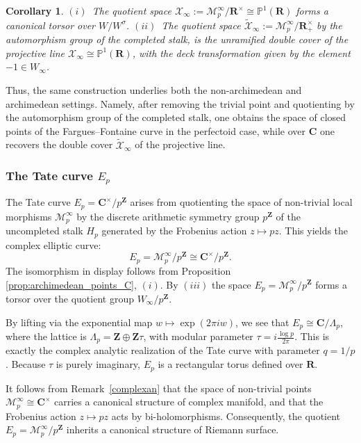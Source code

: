 \documentclass[11pt,a4paper]{article}
\newtheorem{corollary}[theorem]{Corollary}
\newcommand{\C}{\mathbf{C}}
\newcommand{\R}{\mathbf{R}}
\newcommand{\Z}{\mathbf{Z}}
\begin{document}
\begin{corollary}\label{luriearch}
$(i)$~The quotient space $\mathcal{X}_\infty :=\mathcal{M}_{p}^{\infty} / \R^\times\cong \mathbb{P}^1(\R)$  forms a canonical torsor over $W / W^\sigma$.\newline
$(ii)$~The quotient space $\widetilde{\mathcal{X}}_\infty:=\mathcal{M}_{p}^{\infty} / \R_+^\times$ by the automorphism group of the completed stalk, is the  unramified double cover of the projective line   $\mathcal{X}_\infty  \cong \mathbb{P}^1(\R)$, with the deck transformation given by the  element $-1\in W_\infty$.
\end{corollary}


Thus, the same construction underlies both the non-archimedean and archimedean settings. Namely, after removing the trivial point and quotienting by the automorphism group of the completed stalk, one obtains the space of closed points of the Fargues–Fontaine curve in the perfectoid case, while over $\C$ one recovers the double cover $\tilde{\mathcal{X}}_\infty$ of the projective line. 

\subsubsection{The  Tate curve $E_p$}

The  Tate curve $E_p=\C^\times / p^\Z$ arises from quotienting the space of  non-trivial local morphisms $\mathcal{M}_{p}^{\infty}$  by the discrete arithmetic symmetry group $p^\Z$ of the uncompleted stalk $H_p$ generated by the  Frobenius action $z \mapsto pz$. This yields  the complex elliptic curve:
\[
E_p =\mathcal{M}_{p}^{\infty}/p^\Z\cong \C^\times / p^\Z.
\]
The isomorphism in display follows from Proposition \ref{prop:archimedean_points_C}, $(i)$. By $(iii)$ the space  $E_p = \mathcal{M}_{p}^{\infty}/ p^\Z$ forms a torsor over the quotient group $W_\infty / p^\Z$.

By lifting via the exponential map $w \mapsto \exp(2\pi i w)$, we see that $E_p \cong \C / \Lambda_p$, where the lattice is $\Lambda_p = \Z \oplus \Z \tau$, with modular parameter $\tau = i \frac{\log p}{2\pi}$. This is exactly the complex analytic realization of the Tate curve with parameter $q = 1/p$. Because $\tau$ is purely imaginary, $E_p$ is a rectangular torus defined over $\R$.\vspace{.03in}

It follows from Remark~\ref{complexan} that the space of non-trivial points $\mathcal{M}_{p}^{\infty}\cong\C^\times$ carries a canonical structure of complex manifold, and that the Frobenius action
$z\mapsto pz$
acts by bi-holomorphisms. Consequently, the quotient
$
E_p=\mathcal{M}_{p}^{\infty}/p^\Z
$
inherits a canonical structure of Riemann surface.\vspace{.03in}
\end{document}
